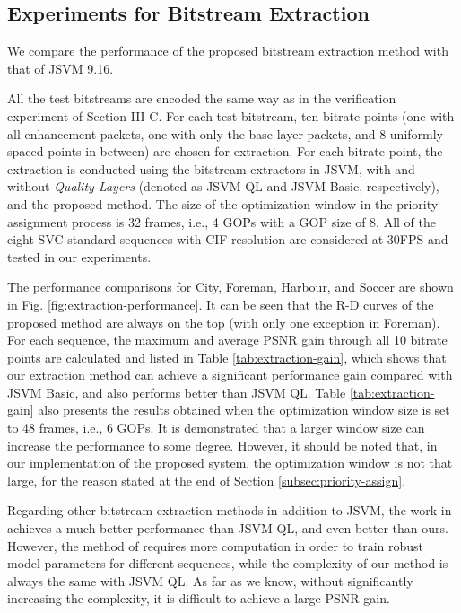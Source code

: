 \documentclass[journal,draftclsnofoot,onecolumn]{IEEEtran}
\begin{document}
\subsection{Experiments for Bitstream Extraction}
\label{subsec:exp-extraction}

We compare the performance of the proposed bitstream extraction method with that of JSVM 9.16.

All the test bitstreams are encoded the same way as in the verification experiment of Section III-C. For each test bitstream, ten bitrate points (one with all enhancement packets, one with only the base layer packets, and 8 uniformly spaced points in between) are chosen for extraction. For each bitrate point, the extraction is conducted using the bitstream extractors in JSVM, with and without \textit{Quality Layers} (denoted as JSVM QL and JSVM Basic, respectively), and the proposed method. The size of the optimization window in the priority assignment process is 32 frames, i.e., 4 GOPs with a GOP size of 8. All of the eight SVC standard sequences with CIF resolution are considered at 30FPS and tested in our experiments.

The performance comparisons for City, Foreman, Harbour, and Soccer are shown in Fig. \ref{fig:extraction-performance}. It can be seen that the R-D curves of the proposed method are always on the top (with only one exception in Foreman). For each sequence, the maximum and average PSNR gain through all 10 bitrate points are calculated and listed in Table \ref{tab:extraction-gain}, which shows that our extraction method can achieve a significant performance gain compared with JSVM Basic, and also performs better than JSVM QL. Table \ref{tab:extraction-gain} also presents the results obtained when the optimization window size is set to 48 frames, i.e., 6 GOPs. It is demonstrated that a larger window size can increase the performance to some degree. However, it should be noted that, in our implementation of the proposed system, the optimization window is not that large, for the reason stated at the end of Section \ref{subsec:priority-assign}.

Regarding other bitstream extraction methods in addition to JSVM, the work in \cite{Maani09} achieves a much better performance than JSVM QL, and even better than ours. However, the method of \cite{Maani09} requires more computation in order to train robust model parameters for different sequences, while the complexity of our method is always the same with JSVM QL. As far as we know, without significantly increasing the complexity, it is difficult to achieve a large PSNR gain.
\end{document}
